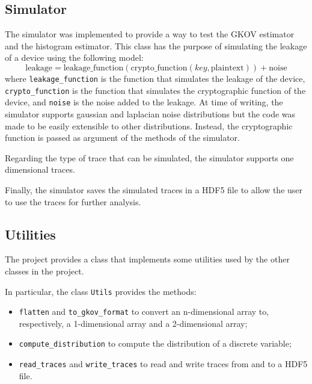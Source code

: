 \documentclass[12pt]{article}
\begin{document}
    \subsection{Simulator}\label{subsec:sim}
    The simulator was implemented to provide a way to test the GKOV estimator and the histogram estimator.
    This class has the purpose of simulating the leakage of a device using the following model:
    \begin{equation}
        \text{leakage} = \text{leakage\_function}(\text{crypto\_function}(key, \text{plaintext})) + \text{noise}\label{eq:sim}
    \end{equation}
    where \texttt{leakage\_function} is the function that simulates the leakage of the device, \texttt{crypto\_function} is the function that simulates the cryptographic function of the device, and \texttt{noise} is the noise added to the leakage.
    At time of writing, the simulator supports gaussian and laplacian noise distributions but the code was made to be easily extensible to other distributions.
    Instead, the cryptographic function is passed as argument of the methods of the simulator.

    Regarding the type of trace that can be simulated, the simulator supports one dimensional traces.

    Finally, the simulator saves the simulated traces in a HDF5 file to allow the user to use the traces for further analysis.

    \subsection{Utilities}\label{subsec:utils}
    The project provides a class that implements some utilities used by the other classes in the project.

    In particular, the class \texttt{Utils} provides the methods:
    \begin{itemize}
        \item \texttt{flatten} and \texttt{to\_gkov\_format} to convert an n-dimensional array to, respectively, a 1-dimensional array and a 2-dimensional array;
        \item \texttt{compute\_distribution} to compute the distribution of a discrete variable;
        \item \texttt{read\_traces} and \texttt{write\_traces} to read and write traces from and to a HDF5 file.
    \end{itemize}
    \newpage
    
    
\end{document}
